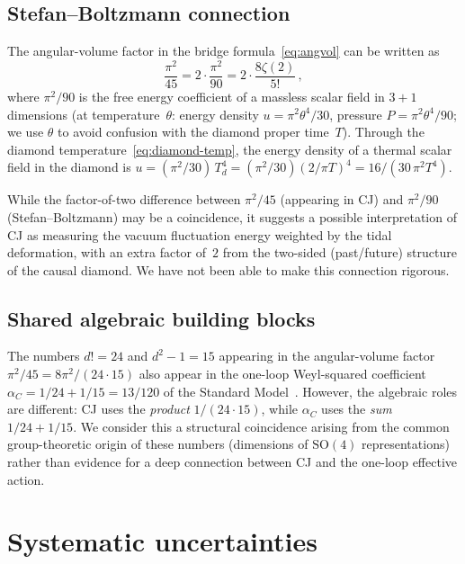 \documentclass[12pt,a4paper]{article}
\theoremstyle{plain}
\theoremstyle{definition}
\theoremstyle{remark}
\begin{document}
\subsection{Stefan--Boltzmann connection}

The angular-volume factor in the bridge formula~\eqref{eq:angvol}
can be written as
\begin{equation}\label{eq:sb-connection}
  \frac{\pi^2}{45} = 2 \cdot \frac{\pi^2}{90}
  = 2 \cdot \frac{8\zeta(2)}{5!}\,,
\end{equation}
where $\pi^2/90$ is the free energy coefficient of a massless
scalar field in $3{+}1$ dimensions (at temperature~$\theta$:
energy density $u = \pi^2\theta^4/30$, pressure
$P = \pi^2\theta^4/90$; we use $\theta$ to avoid confusion with
the diamond proper time~$T$).  Through the diamond
temperature~\eqref{eq:diamond-temp}, the energy density of a
thermal scalar field in the diamond is
$u = (\pi^2/30)\, T_d^4 = (\pi^2/30)(2/\pi T)^4
= 16/(30\, \pi^2 T^4)$.

While the factor-of-two difference between $\pi^2/45$ (appearing
in CJ) and $\pi^2/90$ (Stefan--Boltzmann) may be a coincidence,
it suggests a possible interpretation of CJ as measuring the
vacuum fluctuation energy weighted by the tidal deformation, with
an extra factor of~$2$ from the two-sided (past/future) structure
of the causal diamond.  We have not been able to make this
connection rigorous.

\subsection{Shared algebraic building blocks}

The numbers $d! = 24$ and $d^2 - 1 = 15$ appearing in the
angular-volume factor $\pi^2/45 = 8\pi^2/(24 \cdot 15)$ also
appear in the one-loop Weyl-squared coefficient
$\alpha_C = 1/24 + 1/15 = 13/120$ of the Standard
Model~\cite{Alfyorov:2026ff}.  However, the algebraic roles are
different: CJ uses the \emph{product} $1/(24 \cdot 15)$, while
$\alpha_C$ uses the \emph{sum} $1/24 + 1/15$.  We consider this
a structural coincidence arising from the common group-theoretic
origin of these numbers (dimensions of $\mathrm{SO}(4)$
representations) rather than evidence for a deep connection
between CJ and the one-loop effective action.

\section{Systematic uncertainties}
\label{sec:systematics}
\end{document}
